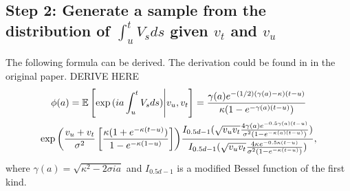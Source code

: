         \subsection*{Step 2: Generate a sample from the distribution of $\int_{u}^t V_s ds$ given $v_t$ and $v_u$}
            The following formula can be derived. {\color{red}The derivation could be found in in the original paper. 
            DERIVE HERE}
            \begin{multline}
                \phi(a) = \mathbb{E}\left[  \exp{(ia\int_{u}^t V_s ds)} \Bigg| v_u, v_t\right] = \frac{\gamma(a)e^{-(1/2)(\gamma(a) - \kappa)(t - u)}}{\kappa(1-e^{-\gamma(a)(t-u)})} \\
                \exp{\left(\frac{v_u + v_t}{\sigma^2} \left[  \frac{\kappa(1+e^{-\kappa(t-u)})}{1-e^{-\kappa(1-u)}}                 \right]     \right)}
                \frac{I_{0.5d-1}(\sqrt{v_uv_t}\frac{4\gamma(a)e^{-0.5\gamma(a)(t-u)}}{\sigma^2(1-e^{-\kappa(a)(t-u)})})}{I_{0.5d-1}(\sqrt{v_uv_t}\frac{4\kappa e^{-0.5\kappa(t-u)}}{\sigma^2(1-e^{-\kappa(t-u)})})},
            \end{multline}
            where $\gamma(a) = \sqrt{\kappa^2 - 2\sigma i a}$ and $I_{0.5d-1}$ is a modified  Bessel function of the first kind.


